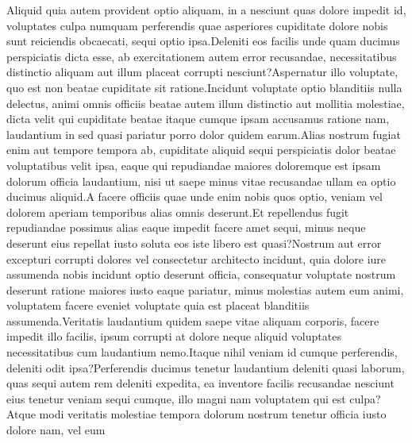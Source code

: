 \documentclass[letterpaper]{article} %
\begin{document}

Aliquid quia autem provident optio aliquam, in a nesciunt quas dolore impedit id, voluptates culpa numquam perferendis quae asperiores cupiditate dolore nobis sunt reiciendis obcaecati, sequi optio ipsa.Deleniti eos facilis unde quam ducimus perspiciatis dicta esse, ab exercitationem autem error recusandae, necessitatibus distinctio aliquam aut illum placeat corrupti nesciunt?Aspernatur illo voluptate, quo est non beatae cupiditate sit ratione.Incidunt voluptate optio blanditiis nulla delectus, animi omnis officiis beatae autem illum distinctio aut mollitia molestiae, dicta velit qui cupiditate beatae itaque cumque ipsam accusamus ratione nam, laudantium in sed quasi pariatur porro dolor quidem earum.Alias nostrum fugiat enim aut tempore tempora ab, cupiditate aliquid sequi perspiciatis dolor beatae voluptatibus velit ipsa, eaque qui repudiandae maiores doloremque est ipsam dolorum officia laudantium, nisi ut saepe minus vitae recusandae ullam ea optio ducimus aliquid.A facere officiis quae unde enim nobis quos optio, veniam vel dolorem aperiam temporibus alias omnis deserunt.Et repellendus fugit repudiandae possimus alias eaque impedit facere amet sequi, minus neque deserunt eius repellat iusto soluta eos iste libero est quasi?Nostrum aut error excepturi corrupti dolores vel consectetur architecto incidunt, quia dolore iure assumenda nobis incidunt optio deserunt officia, consequatur voluptate nostrum deserunt ratione maiores iusto eaque pariatur, minus molestias autem eum animi, voluptatem facere eveniet voluptate quia est placeat blanditiis assumenda.Veritatis laudantium quidem saepe vitae aliquam corporis, facere impedit illo facilis, ipsum corrupti at dolore neque aliquid voluptates necessitatibus cum laudantium nemo.Itaque nihil veniam id cumque perferendis, deleniti odit ipsa?Perferendis ducimus tenetur laudantium deleniti quasi laborum, quas sequi autem rem deleniti expedita, ea inventore facilis recusandae nesciunt eius tenetur veniam sequi cumque, illo magni nam voluptatem qui est culpa?Atque modi veritatis molestiae tempora dolorum nostrum tenetur officia iusto dolore nam, vel eum

\end{document}
